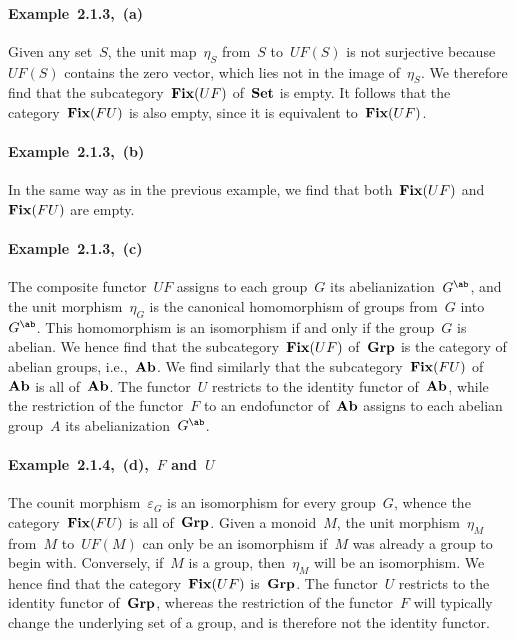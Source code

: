 \paragraph{Example~2.1.3,~(a)}
Given any set~$S$, the unit map~$η_S$ from~$S$ to~$UF(S)$ is not surjective because~$UF(S)$ contains the zero vector, which lies not in the image of~$η_S$.
We therefore find that the subcategory~$\mathop{\mathbf{Fix}}(UF)$ of~$\mathbf{Set}$ is empty.
It follows that the category~$\mathop{\mathbf{Fix}}(FU)$ is also empty, since it is equivalent to~$\mathop{\mathbf{Fix}}(UF)$.

\paragraph{Example~2.1.3,~(b)}
In the same way as in the previous example, we find that both~$\mathop{\mathbf{Fix}}(UF)$ and~$\mathop{\mathbf{Fix}}(FU)$ are empty.

\paragraph{Example~2.1.3,~(c)}
The composite functor~$UF$ assigns to each group~$G$ its abelianization~$G^{\ab}$, and the unit morphism~$η_G$ is the canonical homomorphism of groups from~$G$ into~$G^{\ab}$.
This homomorphism is an isomorphism if and only if the group~$G$ is abelian.
We hence find that the subcategory~$\mathop{\mathbf{Fix}}(UF)$ of~$\mathbf{Grp}$ is the category of abelian groups, i.e.,~$\mathbf{Ab}$.
We find similarly that the subcategory~$\mathop{\mathbf{Fix}}(FU)$ of~$\mathbf{Ab}$ is all of~$\mathbf{Ab}$.
The functor~$U$ restricts to the identity functor of~$\mathbf{Ab}$, while the restriction of the functor~$F$ to an endofunctor of~$\mathbf{Ab}$ assigns to each abelian group~$A$ its abelianization~$G^{\ab}$.

\paragraph{Example~2.1.4,~(d),~$F$ and~$U$}
The counit morphism~$ε_G$ is an isomorphism for every group~$G$, whence the category~$\mathop{\mathbf{Fix}}(FU)$ is all of~$\mathbf{Grp}$.
Given a monoid~$M$, the unit morphism~$η_M$ from~$M$ to~$UF(M)$ can only be an isomorphism if~$M$ was already a group to begin with.
Conversely, if~$M$ is a group, then~$η_M$ will be an isomorphism.
We hence find that the category~$\mathop{\mathbf{Fix}}(UF)$ is~$\mathbf{Grp}$.
The functor~$U$ restricts to the identity functor of~$\mathbf{Grp}$, whereas the restriction of the functor~$F$ will typically change the underlying set of a group, and is therefore not the identity functor.

